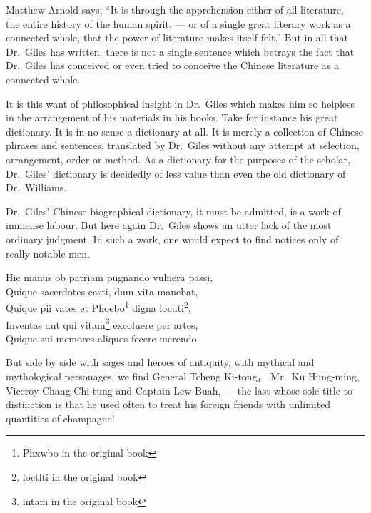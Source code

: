 Matthew Arnold says, ``It is through the apprehension either of all literature, --- the entire history of the human spirit, --- or of a single great literary work as a connected whole, that the power of literature makes itself felt.''
But in all that Dr.~Giles has written, there is not a single sentence which betrays the fact that Dr.~Giles has conceived or even tried to conceive the Chinese literature as a connected whole.

It is this want of philosophical insight in Dr.~Giles which makes him so helpless in the arrangement of his materials in his books.
Take for instance his great dictionary.
It is in no sense a dictionary at all.
It is merely a collection of Chinese phrases and sentences, translated by Dr.~Giles without any attempt at selection, arrangement, order or method.
As a dictionary for the purposes of the scholar, Dr.~Giles' dictionary is decidedly of less value than even the old dictionary of Dr.~Williams.

Dr.~Giles' Chinese biographical dictionary, it must be admitted, is a work of immense labour.
But here again Dr.~Giles shows an utter lack of the most ordinary judgment.
In such a work, one would expect to find notices only of really notable men.
\begin{center}
    Hic manus ob patriam pugnando vulnera passi, \\
    Quique sacerdotes casti, dum vita manebat, \\
    Quique pii vates et Phoebo\footnote{Phxwbo in the original book} digna locuti\footnote{loctlti in the original book}, \\
    Inventas aut qui vitam\footnote{intam in the original book} excoluere per artes, \\
    Quique sui memores aliquos fecere merendo.
\end{center}

But side by side with sages and heroes of antiquity, with mythical and mythological personages, we find General Tcheng Ki-tong， Mr.~Ku Hung-ming, Viceroy Chang Chi-tung and Captain Lew Buah, --- the last whose sole title to distinction is that he used often to treat his foreign friends with unlimited quantities of champagne!

